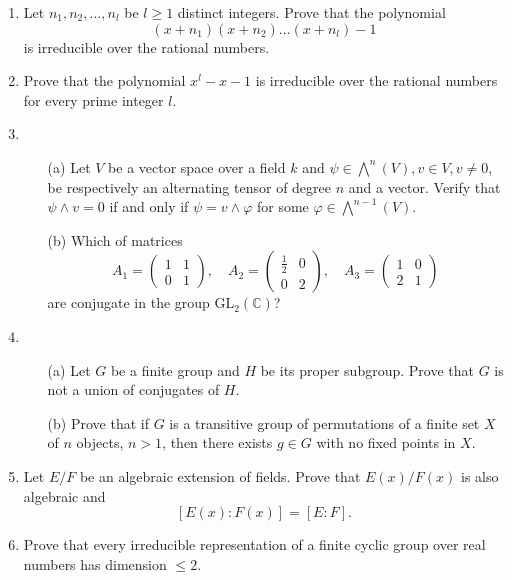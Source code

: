 \documentclass{article}
\begin{document}
\begin{enumerate}
    \item Let \(n_{1}, n_{2}, \ldots, n_{l}\) be \(l \geq 1\) distinct integers. Prove that the polynomial 
    \[(x + n_{1})(x + n_{2}) \ldots (x + n_{l}) - 1\] 
    is irreducible over the rational numbers.

    \item Prove that the polynomial \(x^{l} - x - 1\) is irreducible over the rational numbers for every prime integer \(l\).

    \item 
    \begin{itemize}
        \item[(a)] Let \(V\) be a vector space over a field \(k\) and \(\psi \in \bigwedge^{n}(V), v \in V, v \neq 0\), be respectively an alternating tensor of degree \(n\) and a vector. Verify that \(\psi \land v = 0\) if and only if \(\psi = v \land \varphi\) for some \(\varphi \in \bigwedge^{n-1}(V)\).
        
        \item[(b)] Which of matrices 
        \[A_{1} = \begin{pmatrix} 1 & 1 \\ 0 & 1 \end{pmatrix}, \quad A_{2} = \begin{pmatrix} \frac{1}{2} & 0 \\ 0 & 2 \end{pmatrix}, \quad A_{3} = \begin{pmatrix} 1 & 0 \\ 2 & 1 \end{pmatrix}\] 
        are conjugate in the group \(\text{GL}_{2}(\mathbb{C})\)?
    \end{itemize}

    \item 
    \begin{itemize}
        \item[(a)] Let \(G\) be a finite group and \(H\) be its proper subgroup. Prove that \(G\) is not a union of conjugates of \(H\).
        
        \item[(b)] Prove that if \(G\) is a transitive group of permutations of a finite set \(X\) of \(n\) objects, \(n > 1\), then there exists \(g \in G\) with no fixed points in \(X\).
    \end{itemize}

    \item Let \(E/F\) be an algebraic extension of fields. Prove that \(E(x)/F(x)\) is also algebraic and 
    \[[E(x):F(x)] = [E:F].\]

    \item Prove that every irreducible representation of a finite cyclic group over real numbers has dimension \(\leq 2\).
\end{enumerate}
\end{document}
